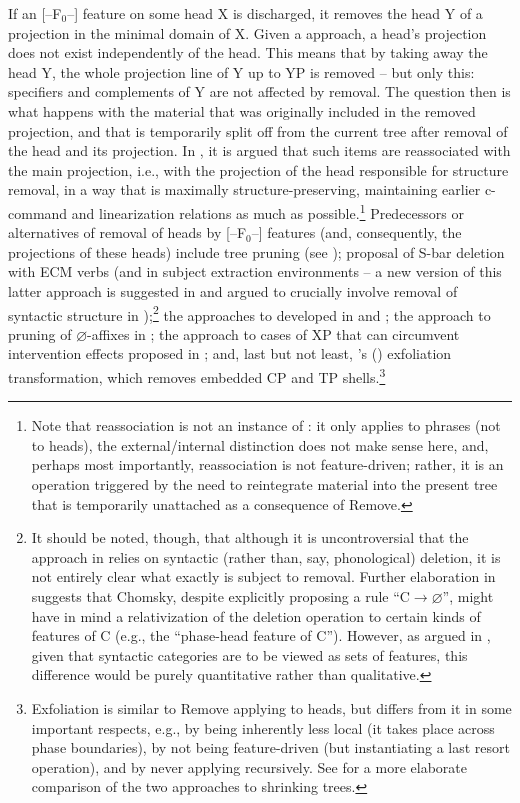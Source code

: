 \documentclass[output=paper]{langsci/langscibook}
\newcommand{\scite}[2]{\citeauthor{#2}#1 (\citeyear{#2})}
\begin{document}
If an [--F$_0$--] feature on some head X is discharged, it removes the head Y
of a projection in the minimal domain of X. Given a 
approach, a head's projection does not exist independently of the head. This
means that by taking away the head Y, the whole projection line of Y up to YP
is removed -- but only this: specifiers and complements of Y are not affected
by removal.  The question then is what happens with the material that was
originally included in the removed projection, and that is temporarily split
off from the current tree after removal of the head and its projection. In
\citet{Mueller:17:pre}, it is argued that such items are reassociated with the
main projection, i.e., with the projection of the head responsible for
structure removal, in a way that is maximally structure-preserving, maintaining
earlier c-command and linearization relations as much as
possible.\footnote{Note that reassociation is not an instance of : it only
    applies to phrases (not to heads), the external/internal distinction does
    not make sense here, and, perhaps most importantly, reassociation is not
    feature-driven; rather, it is an operation triggered by the need to
reintegrate material into the present tree that is temporarily unattached as a
consequence of Remove.} Predecessors or alternatives of removal of heads by
[--F$_0$--] features (and, consequently, the projections of these heads)
include tree pruning (see \citealt[Ch.~3]{Ross:67}); 
proposal of S-bar deletion with ECM verbs (and in subject extraction
environments -- a new version of this latter approach is suggested in
\citet[24]{Chomsky:15} and argued to crucially involve removal of syntactic
structure in \citealt{Hornstein:14:fac});\footnote{It should be noted, though,
    that although it is uncontroversial that the approach in \citet{Chomsky:15}
    relies on syntactic (rather than, say, phonological) deletion, it is not
    entirely clear what exactly is subject to removal. Further elaboration in
    \citet{Chomsky2015} suggests that Chomsky, despite explicitly proposing a
    rule ``C$\rightarrow\varnothing$'', might have in mind a relativization of the
    deletion operation to certain kinds of features of C  (e.g., the
``phase-head feature of C''). However, as argued in \citet{Mueller:17:fdm},
given that syntactic categories are to be viewed as sets of features, this
difference would be purely quantitative rather than qualitative.} the
approaches to  developed in \citet{Heycock&Kroch:94} and
\citet{Stepanov:12};  the approach to pruning of $\varnothing$-affixes in
\citet{Embick:10}; the approach to cases of XP  that can circumvent
intervention effects proposed in \citet{Heck:16}; and, last but not least,
\scite{'s}{Pesetsky:16} exfoliation transformation, which removes embedded CP
and TP shells.\footnote{Exfoliation is similar to Remove applying to heads, but
    differs from it in some important respects, e.g., by being inherently less
    local (it takes place across phase boundaries), by not being feature-driven
    (but instantiating a last resort operation), and by never applying
recursively.  See \citet{Mueller:17:pre} for a more elaborate comparison of the
two approaches to shrinking trees.}
\end{document}
